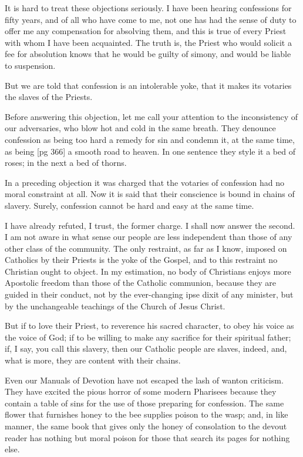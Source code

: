 It is hard to treat these objections seriously. I
have been hearing confessions for fifty years, and
of all who have come to me, not one has had the
sense of duty to offer me any compensation for absolving
them, and this is true of every Priest with
whom I have been acquainted. The truth is, the
Priest who would solicit a fee for absolution knows
that he would be guilty of simony, and would be
liable to suspension.

But we are told that confession is an intolerable
yoke, that it makes its votaries the slaves of the
Priests.

Before answering this objection, let me call your
attention to the inconsistency of our adversaries,
who blow hot and cold in the same breath. They
denounce confession as being too hard a remedy
for sin and condemn it, at the same time, as being
[pg 366]
a smooth road to heaven. In one sentence they
style it a bed of roses; in the next a bed of thorns.

In a preceding objection it was charged that the
votaries of confession had no moral constraint at
all. Now it is said that their conscience is bound
in chains of slavery. Surely, confession cannot be
hard and easy at the same time.

I have already refuted, I trust, the former
charge. I shall now answer the second. I am not
aware in what sense our people are less independent
than those of any other class of the community.
The only restraint, as far as I know, imposed
on Catholics by their Priests is the yoke of
the Gospel, and to this restraint no Christian
ought to object. In my estimation, no body of
Christians enjoys more Apostolic freedom than
those of the Catholic communion, because they are
guided in their conduct, not by the ever-changing
ipse dixit of any minister, but by the unchangeable
teachings of the Church of Jesus Christ.

But if to love their Priest, to reverence his
sacred character, to obey his voice as the voice of
God; if to be willing to make any sacrifice for their
spiritual father; if, I say, you call this slavery,
then our Catholic people are slaves, indeed, and,
what is more, they are content with their chains.

Even our Manuals of Devotion have not escaped
the lash of wanton criticism. They have excited
the pious horror of some modern Pharisees because
they contain a table of sins for the use of
those preparing for confession. The same flower
that furnishes honey to the bee supplies poison to
the wasp; and, in like manner, the same book that
gives only the honey of consolation to the devout
reader has nothing but moral poison for those that
search its pages for nothing else.

